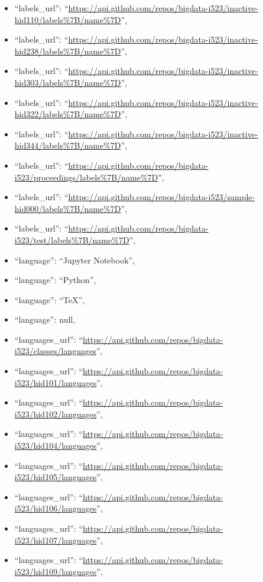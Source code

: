 \begin{itemize}
\item
  ``labels\_url'':
  ``\url{https://api.github.com/repos/bigdata-i523/inactive-hid110/labels\%7B/name\%7D}'',
\item
  ``labels\_url'':
  ``\url{https://api.github.com/repos/bigdata-i523/inactive-hid238/labels\%7B/name\%7D}'',
\item
  ``labels\_url'':
  ``\url{https://api.github.com/repos/bigdata-i523/inactive-hid303/labels\%7B/name\%7D}'',
\item
  ``labels\_url'':
  ``\url{https://api.github.com/repos/bigdata-i523/inactive-hid322/labels\%7B/name\%7D}'',
\item
  ``labels\_url'':
  ``\url{https://api.github.com/repos/bigdata-i523/inactive-hid344/labels\%7B/name\%7D}'',
\item
  ``labels\_url'':
  ``\url{https://api.github.com/repos/bigdata-i523/proceedings/labels\%7B/name\%7D}'',
\item
  ``labels\_url'':
  ``\url{https://api.github.com/repos/bigdata-i523/sample-hid000/labels\%7B/name\%7D}'',
\item
  ``labels\_url'':
  ``\url{https://api.github.com/repos/bigdata-i523/test/labels\%7B/name\%7D}'',
\item
  ``language'': ``Jupyter Notebook'',
\item
  ``language'': ``Python'',
\item
  ``language'': ``TeX'',
\item
  ``language'': null,
\item
  ``languages\_url'':
  ``\url{https://api.github.com/repos/bigdata-i523/classes/languages}'',
\item
  ``languages\_url'':
  ``\url{https://api.github.com/repos/bigdata-i523/hid101/languages}'',
\item
  ``languages\_url'':
  ``\url{https://api.github.com/repos/bigdata-i523/hid102/languages}'',
\item
  ``languages\_url'':
  ``\url{https://api.github.com/repos/bigdata-i523/hid104/languages}'',
\item
  ``languages\_url'':
  ``\url{https://api.github.com/repos/bigdata-i523/hid105/languages}'',
\item
  ``languages\_url'':
  ``\url{https://api.github.com/repos/bigdata-i523/hid106/languages}'',
\item
  ``languages\_url'':
  ``\url{https://api.github.com/repos/bigdata-i523/hid107/languages}'',
\item
  ``languages\_url'':
  ``\url{https://api.github.com/repos/bigdata-i523/hid109/languages}'',

\end{itemize}
